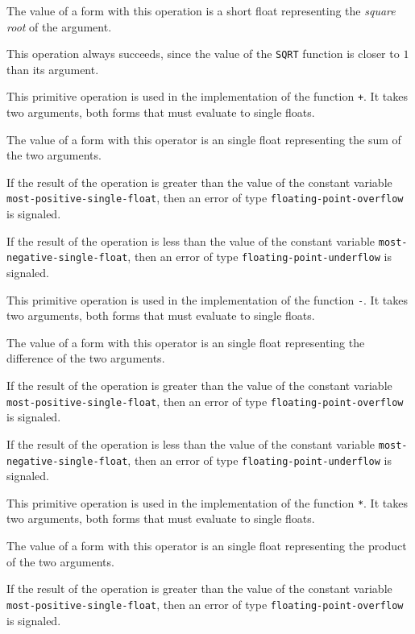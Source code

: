 The value of a form with this operation is a short float representing
the \emph{square root} of the argument.

This operation always succeeds, since the value of the \texttt{SQRT}
function is closer to $1$ than its argument.

 {}

This primitive operation is used in the implementation of the
\commonlisp{} function \texttt{+}.  It takes two arguments, both forms
that must evaluate to single floats.

The value of a form with this operator is an single float
representing the sum of the two arguments.

If the result of the operation is greater than the value of the
constant variable \texttt{most-positive-single-float}, then an error of
type \texttt{floating-point-overflow} is signaled.

If the result of the operation is less than the value of the
constant variable \texttt{most-negative-single-float}, then an error of
type \texttt{floating-point-underflow} is signaled.

 {}

This primitive operation is used in the implementation of the
\commonlisp{} function \texttt{-}.  It takes two arguments, both forms
that must evaluate to single floats.

The value of a form with this operator is an single float
representing the difference of the two arguments.

If the result of the operation is greater than the value of the
constant variable \texttt{most-positive-single-float}, then an error of
type \texttt{floating-point-overflow} is signaled.

If the result of the operation is less than the value of the
constant variable \texttt{most-negative-single-float}, then an error of
type \texttt{floating-point-underflow} is signaled.

 {}

This primitive operation is used in the implementation of the
\commonlisp{} function \texttt{*}.  It takes two arguments, both forms
that must evaluate to single floats.

The value of a form with this operator is an single float
representing the product of the two arguments.

If the result of the operation is greater than the value of the
constant variable \texttt{most-positive-single-float}, then an error of
type \texttt{floating-point-overflow} is signaled.

